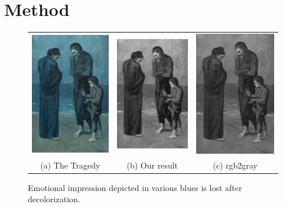 %
\section{Method}
\label{sec:method}
%

\begin{figure}[t]
\begin{center}
\begin{tabular}{ccc}		
\includegraphics[width=0.3\linewidth]{fig/Poor-nga.jpg} &
\includegraphics[width=0.3\linewidth]{fig/Poor-nga-sparse_dr.png} & 
\includegraphics[width=0.3\linewidth]{fig/Poor-nga-rgb2gray.png} \\
(a) The Tragedy & (b) Our result & (c) rgb2gray
\end{tabular} 	
\end{center}
\caption{Emotional impression depicted in various blues is lost after decolorization.}
\label{fig:difficulty}
\end{figure}

